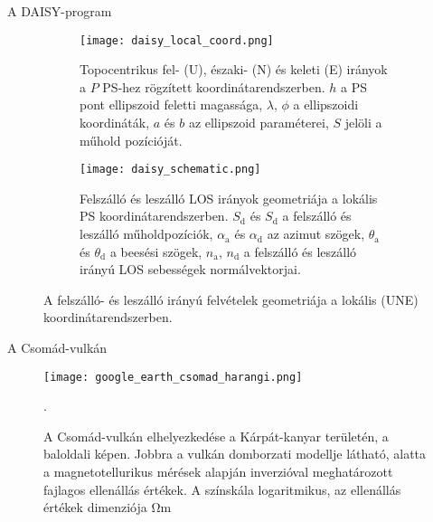 \documentclass[14pt, aspectratio=169]{beamer}
\begin{document}
\begin{frame}{A DAISY-program}
    \vspace{-10pt}
    \begin{center}
        \begin{figure}
            \begin{subfigure}[t]{.49\linewidth}
                \centering
                \texttt{[image: daisy\_local\_coord.png]}
                \caption{Topocentrikus fel- (U), északi- (N) és keleti (E) irányok a $P$ PS-hez rögzített koordinátarendszerben. $h$ a PS pont ellipszoid feletti magassága, $\lambda$, $\phi$ a ellipszoidi koordináták, $a$ és $b$ az ellipszoid paraméterei, $S$ jelöli a műhold pozícióját.}
            \end{subfigure}
            \begin{subfigure}[t]{.49\linewidth}
                \centering
                \texttt{[image: daisy\_schematic.png]}
                \caption{Felszálló és leszálló LOS irányok geometriája a lokális PS koordinátarendszerben. $S_{\text{d}}$ és $S_{\text{d}}$ a felszálló és leszálló műholdpozíciók, $\alpha_{\text{a}}$ és $\alpha_{\text{d}}$ az azimut szögek, $\theta_{\text{a}}$ és $\theta_{\text{d}}$ a beesési szögek, $n_{\text{a}}$, $n_{\text{d}}$ a felszálló és leszálló irányú LOS sebességek normálvektorjai.}
            \end{subfigure}
        \caption{A felszálló- és leszálló irányú felvételek geometriája a lokális (UNE) koordinátarendszerben.}
        \end{figure}
    \end{center}
\end{frame}


\begin{frame}{A Csomád-vulkán}
    \begin{figure}
        \centering
        \texttt{[image: google\_earth\_csomad\_harangi.png]}
        \caption{A Csomád-vulkán elhelyezkedése a Kárpát-kanyar területén, a baloldali képen. Jobbra a vulkán domborzati modellje látható, alatta a magnetotellurikus mérések alapján inverzióval meghatározott fajlagos ellenállás értékek. A színskála logaritmikus, az ellenállás értékek dimenziója $\si{\ohm\meter}$}.
    \end{figure}
\end{frame}

\end{document}

